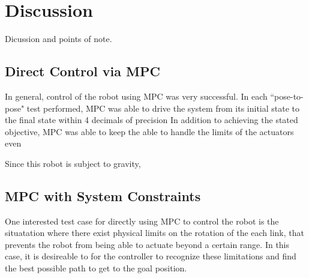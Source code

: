 \documentclass[journal]{IEEEtran}
\begin{document}
\subsection{}

\subsection{}

\subsection{}

\subsection{}

\subsection{}

\subsection{}

\section{Discussion}

Dicussion and points of note.


\subsection{Direct Control via MPC}

In general, control of the robot using MPC was very successful. In each ``pose-to-pose" test performed, MPC was able to drive the system from its initial state to the final state within 4 decimals of precision In addition to achieving the stated objective, MPC was able to keep the able to handle the limits of the actuators even

Since this robot is subject to gravity,

\subsection{MPC with System Constraints}

One interested test case for directly using MPC to control the robot is the situatation where there exist physical limits on the rotation of the each link, that prevents the robot from being able to actuate beyond a certain range. In this case, it is desireable to for the controller to recognize these limitations and find the best possible path to get to the goal position.
\end{document}
